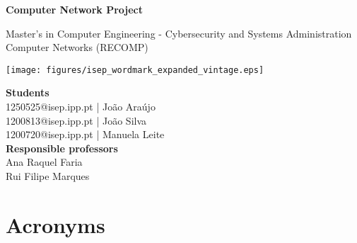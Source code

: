 \documentclass[a4paper,12pt]{report}
\begin{document}
\begin{titlepage}
    \centering
    \vspace*{1.5cm}
    
    \Huge
    \textbf{Computer Network Project}
    
    \vspace{0.5cm}
    \Large
    Master's in Computer Engineering - Cybersecurity and Systems Administration \\
    Computer Networks (RECOMP)
    
    \vspace{1.5cm}
    
    \vfill

    \texttt{[image: figures/isep\_wordmark\_expanded\_vintage.eps]}
    
    \vspace{10cm}
    \small
    \textbf{Students} \\
    1250525@isep.ipp.pt | João Araújo \\ 
    1200813@isep.ipp.pt | João Silva  \\
    1200720@isep.ipp.pt | Manuela Leite \\
   
    

    \vspace{0.5cm}
    \small
    \textbf{Responsible professors} \\
    Ana Raquel Faria \\
    Rui Filipe Marques
    
    \vfill
\end{titlepage}

\tableofcontents
\newpage
\listoffigures
\newpage
\listoftables
\newpage
\lstlistoflistings
\renewcommand{\lstlistingname}{Code}
\chapter*{Acronyms}
\begin{acronym}[XXXX] %
\end{acronym}
\end{document}

